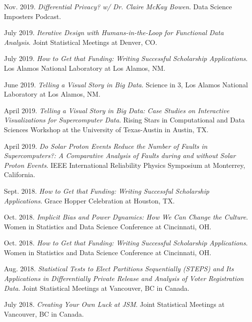 \documentclass[11pt, letterpaper, roman]{moderncv} %
\begin{document}
\begin{etaremune}[topsep=0pt, itemsep=6pt, partopsep=0pt, parsep=0pt]
  \item Nov. 2019. \textit{Differential Privacy? w/ Dr. Claire McKay Bowen}. Data Science Imposters Podcast.
  
  \item July 2019. \textit{Iterative Design with Humans-in-the-Loop for Functional Data Analysis}. Joint Statistical Meetings at Denver, CO. 

  \item July 2019. \textit{How to Get that Funding: Writing Successful Scholarship Applications}. Los Alamos National Laboratory at Los Alamos, NM.

  \item June 2019. \textit{Telling a Visual Story in Big Data}. Science in 3, Los Alamos National Laboratory at Los Alamos, NM. 
  
  \item April 2019. \textit{Telling a Visual Story in Big Data: Case Studies on Interactive Visualizations for Supercomputer Data}. Rising Stars in Computational and Data Sciences Workshop at the University of Texas-Austin in Austin, TX.

  \item April 2019. \textit{Do Solar Proton Events Reduce the Number of Faults in Supercomputers?: A Comparative Analysis of Faults during and without Solar Proton Events}. IEEE International Reliability Physics Symposium at Monterrey, California.
  
  \item Sept. 2018. \textit{How to Get that Funding: Writing Successful Scholarship Applications}. Grace Hopper Celebration at Houston, TX.
  
  \item Oct. 2018. \textit{Implicit Bias and Power Dynamics: How We Can Change the Culture}. Women in Statistics and Data Science Conference at Cincinnati, OH.

  \item Oct. 2018. \textit{How to Get that Funding: Writing Successful Scholarship Applications}. Women in Statistics and Data Science Conference at Cincinnati, OH.

  \item Aug. 2018. \textit{Statistical Tests to Elect Partitions Sequentially (STEPS) and Its Applications in Differentially Private Release and Analysis of Voter Registration Data}. Joint Statistical Meetings at Vancouver, BC in Canada.
  
  \item July 2018. \textit{Creating Your Own Luck at JSM}. Joint Statistical Meetings at Vancouver, BC in Canada.
  

\end{etaremune}
\end{document}

